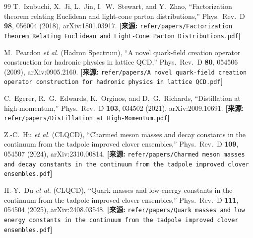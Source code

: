 \documentclass[12pt,a4paper]{ctexart}
\theoremstyle{definition}
\begin{document}
\begin{thebibliography}{99}
T.~Izubuchi, X.~Ji, L.~Jin, I.~W.~Stewart, and Y.~Zhao,
``Factorization theorem relating Euclidean and light-cone parton distributions,''
Phys.\ Rev.\ D \textbf{98}, 056004 (2018), arXiv:1801.03917.
\quad\textbf{[来源:} \texttt{refer/papers/Factorization Theorem Relating Euclidean and Light-Cone Parton Distributions.pdf}\textbf{]}

M.~Peardon \textit{et al.} (Hadron Spectrum),
``A novel quark-field creation operator construction for hadronic physics in lattice QCD,''
Phys.\ Rev.\ D \textbf{80}, 054506 (2009), arXiv:0905.2160.
\quad\textbf{[来源:} \texttt{refer/papers/A novel quark-field creation operator construction for hadronic physics in lattice QCD.pdf}\textbf{]}

C.~Egerer, R.~G.~Edwards, K.~Orginos, and D.~G.~Richards,
``Distillation at high-momentum,''
Phys.\ Rev.\ D \textbf{103}, 034502 (2021), arXiv:2009.10691.
\quad\textbf{[来源:} \texttt{refer/papers/Distillation at High-Momentum.pdf}\textbf{]}

Z.-C.~Hu \textit{et al.} (CLQCD),
``Charmed meson masses and decay constants in the continuum from the tadpole improved clover ensembles,''
Phys.\ Rev.\ D \textbf{109}, 054507 (2024), arXiv:2310.00814.
\quad\textbf{[来源:} \texttt{refer/papers/Charmed meson masses and decay constants in the continuum from the tadpole improved clover ensembles.pdf}\textbf{]}

H.-Y.~Du \textit{et al.} (CLQCD),
``Quark masses and low energy constants in the continuum from the tadpole improved clover ensembles,''
Phys.\ Rev.\ D \textbf{111}, 054504 (2025), arXiv:2408.03548.
\quad\textbf{[来源:} \texttt{refer/papers/Quark masses and low energy constants in the continuum from the tadpole improved clover ensembles.pdf}\textbf{]}

\end{thebibliography}
\end{document}
